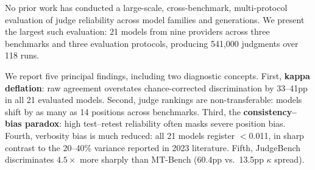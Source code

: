 \documentclass[11pt]{article}
\begin{document}

No prior work has conducted a large-scale, cross-benchmark, multi-protocol evaluation of judge reliability across model families and generations. We present the largest such evaluation: 21 models from nine providers across three benchmarks and three evaluation protocols, producing 541{,}000 judgments over 118 runs.


We report five principal findings, including two diagnostic concepts. First, \textbf{kappa deflation}: raw agreement overstates chance-corrected discrimination by 33--41pp in all 21 evaluated models. Second, judge rankings are non-transferable: models shift by as many as 14 positions across benchmarks. Third, the \textbf{consistency--bias paradox}: high test--retest reliability often masks severe position bias. Fourth, verbosity bias is much reduced: all 21 models register $<$0.011, in sharp contrast to the 20--40\% variance reported in 2023 literature. Fifth, JudgeBench discriminates $4.5\times$ more sharply than MT-Bench (60.4pp vs.\ 13.5pp $\kappa$ spread).
\end{document}
